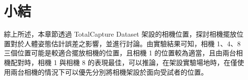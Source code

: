 \section{小結}
綜上所述，本章節透過 TotalCapture Dataset 架設的相機位置，探討相機擺放位置對於人體姿態估計誤差之影響，並進行討論。由實驗結果可知，相機 1、4、8 三個位置可能是較適合擺放相機的位置，且相機 1 的位置較為適當，且由兩台相機配對時，相機 1 與相機 8 的表現最佳，可以推論，在架設實驗場地時，在僅使用兩台相機的情況下可以優先分別將相機架設於面向受試者的位置。

\clearpage